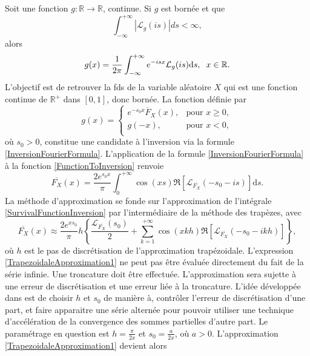 Soit une fonction $g:\mathbb{R}\rightarrow\mathbb{R}$, continue. Si $g$ est bornée et que 
\begin{equation*}
\int_{-\infty}^{+\infty}|\mathcal{L}_{g}(is)|ds<\infty,
\end{equation*}
alors 
\begin{equation}\label{InversionFourierFormula}
g(x)=\frac{1}{2\pi}\int_{-\infty}^{+\infty}e^{-isx}\mathcal{L}_{g}(is)\text{d}s,\hspace{0.2cm}x\in\mathbb{R}.
\end{equation}
L\rq{}objectif est de retrouver la \gls{fds} de la variable aléatoire $X$ qui est une fonction continue de $\mathbb{R}^{+}$ dans $[0,1]$, donc bornée. La fonction définie par 
\begin{equation}\label{FunctionToInversion}
g(x)=
\begin{cases}	
e^{-s_{0}x}\overline{F}_{X}(x), &\mbox{pour } x\geq0, \\ 
g(-x),& \mbox{pour } x<0,\\ 
\end{cases}
\end{equation}
où $s_{0}>0$, constitue une candidate à l\rq{}inversion via la formule \eqref{InversionFourierFormula}. L\rq{}application de la formule \eqref{InversionFourierFormula} à la fonction \eqref{FunctionToInversion} renvoie
\begin{equation}\label{SurvivalFunctionInversion}
\overline{F_{X}}(x)=\frac{2e^{s_{0}x}}{\pi}\int_{0}^{+\infty}\cos(xs)\Re\left[\mathcal{L}_{\overline{F_{X}}}\left(-s_{0}-is\right)\right]\text{d}s.
\end{equation} 
La méthode d\rq{}approximation se fonde sur l\rq{}approximation de l\rq{}intégrale \eqref{SurvivalFunctionInversion} par l\rq{}intermédiaire de la méthode des trapèzes, avec
\begin{equation}\label{TrapezoidaleApproximation1}
\overline{F_{X}}(x)\approx\frac{2e^{xs_{0}}}{\pi}h\left\{\frac{\mathcal{L}_{\overline{F_{X}}}(s_{0})}{2}+\sum_{k=1}^{+\infty}\cos(xkh)\Re\left[\mathcal{L}_{\overline{F_{X}}}\left(-s_{0}-ikh\right)\right]\right\},
\end{equation}
où $h$ est le pas de discrétisation de l\rq{}approximation trapézoidale. L\rq{}expression \eqref{TrapezoidaleApproximation1} ne peut pas être évaluée directement du fait de la série infinie. Une troncature doit être effectuée. L\rq{}approximation sera sujette à une erreur de discrétisation et une erreur liée à la troncature. L\rq{}idée développée dans \citet{AbWh92} est de choisir $h$ et $s_{0}$ de manière à, contrôler l\rq{}erreur de discrétisation d\rq{}une part, et faire apparaitre une série alternée pour pouvoir utiliser une technique d\rq{}accélération de la convergence des sommes partielles d\rq{}autre part. Le paramétrage en question est $h=\frac{\pi}{2x}$ et $s_{0}=\frac{a}{2x}$, où $a>0$. L\rq{}approximation \eqref{TrapezoidaleApproximation1} devient alors
